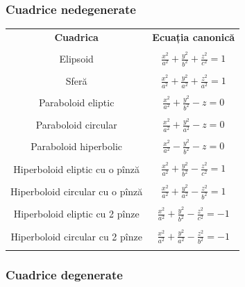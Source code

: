 
\subsubsection{Cuadrice nedegenerate}
\label{subsec:cuadrice-nedeg}

\begin{center}
  \begin{tabular}{| c | c |}
    \hline
    \textbf{Cuadrica} & \textbf{Ecuația canonică} \\ & \\
    Elipsoid & $\frac{x^2}{a^2} + \frac{y^2}{b^2} + \frac{z^2}{c^2} = 1$ \\ & \\
    Sferă & $\frac{x^2}{a^2} + \frac{y^2}{a^2} + \frac{z^2}{a^2} = 1$ \\ & \\
    Paraboloid eliptic & $\frac{x^2}{a^2} + \frac{y^2}{b^2} - z = 0$ \\ & \\
    Paraboloid circular & $\frac{x^2}{a^2} + \frac{y^2}{a^2} - z = 0$ \\ & \\
    Paraboloid hiperbolic & $\frac{x^2}{a^2} - \frac{y^2}{b^2} - z = 0$ \\ & \\
    Hiperboloid eliptic cu o pînză & $\frac{x^2}{a^2} + \frac{y^2}{b^2} - \frac{z^2}{c^2} = 1$ \\ & \\
    Hiperboloid circular cu o pînză & $\frac{x^2}{a^2} + \frac{y^2}{a^2} - \frac{z^2}{b^2} = 1$ \\ & \\
    Hiperboloid eliptic cu 2 pînze & $\frac{x^2}{a^2} + \frac{y^2}{b^2} - \frac{z^2}{c^2} = -1$ \\ & \\
    Hiperboloid circular cu 2 pînze & $\frac{x^2}{a^2} + \frac{y^2}{a^2} - \frac{z^2}{b^2} = -1$ \\ & \\
    \hline
  \end{tabular}
\end{center}



\subsubsection{Cuadrice degenerate}
\label{subsec:cuadrice-deg}


